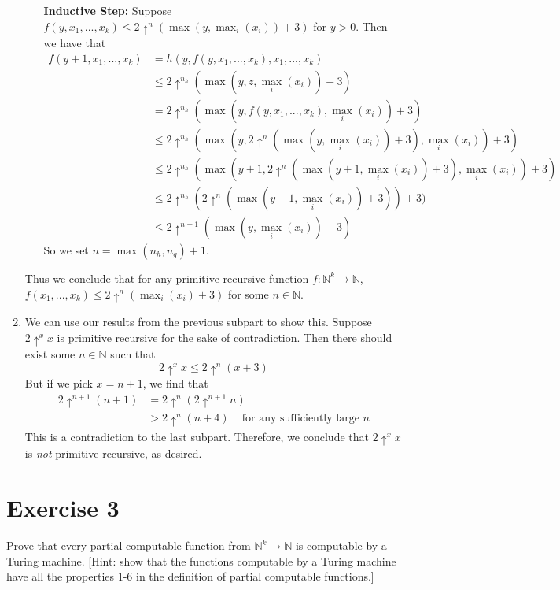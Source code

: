 \documentclass{article}
\newcommand{\nat}{\mathbb{N}}
\begin{document}
\begin{enumerate}
\begin{enumerate}
        \textbf{Inductive Step:} Suppose $f(y, x_1, ..., x_k) \leq 2\uparrow^n (\max(y, \max_i(x_i)) + 3)$ for $y > 0$.
        Then we have that
        \begin{align*}
        f(y+1, x_1, ..., x_k) &= h(y, f(y, x_1, ..., x_k), x_1, ..., x_k) \\
            &\leq 2 \uparrow^{n_h}(\max(y, z,\max_i(x_i)) + 3) \\
            &= 2\uparrow^{n_h} (\max(y, f(y, x_1, ..., x_k), \max_i(x_i)) + 3) \\
            &\leq 2\uparrow^{n_h}(\max(y, {2\uparrow^n (\max(y, \max_i(x_i)) + 3)}, \max_i(x_i)) + 3)\\ 
            &\leq 2\uparrow^{n_h}(\max(y+1, {2\uparrow^n (\max(y+1, \max_i(x_i)) + 3)}, \max_i(x_i)) + 3) \\
            &\leq 2\uparrow^{n_h}({2\uparrow^n (\max(y+1, \max_i(x_i)) + 3)}) + 3) \\
            &\leq 2\uparrow^{n+1}(\max(y, \max_i(x_i)) +3)
        \end{align*}
        So we set $n = \max(n_h, n_g) + 1$.
    \end{enumerate}
    Thus we conclude that for any primitive recursive function $f: \nat^k \to \nat$, $f(x_1, ..., x_k) \leq 2\uparrow^n(\max_i(x_i) + 3)$ for some $n \in \nat$.

    \item We can use our results from the previous subpart to show this.
    Suppose $2\uparrow^x x$ is primitive recursive for the sake of contradiction.
    Then there should exist some $n \in \nat$ such that
    $$2\uparrow^x x \leq 2 \uparrow^n (x + 3)$$
    But if we pick $x = n + 1$, we find that
    \begin{align*}
        2\uparrow^{n+1}(n+1) 
        &= 2\uparrow^n(2\uparrow^{n+1}n) \\
        &> 2\uparrow^n (n + 4) \;\;\;\text{ for any sufficiently large }n
    \end{align*}
    This is a contradiction to the last subpart.
    Therefore, we conclude that $2\uparrow^x x$ is \textit{not} primitive recursive, as desired.
\end{enumerate}

\newpage
\section*{Exercise 3}
Prove that every partial computable function from $\nat^k \to \nat$ is computable by a Turing machine.
[Hint: show that the functions computable by a Turing machine have all the properties 1-6 in the definition of partial computable functions.]
\end{document}
